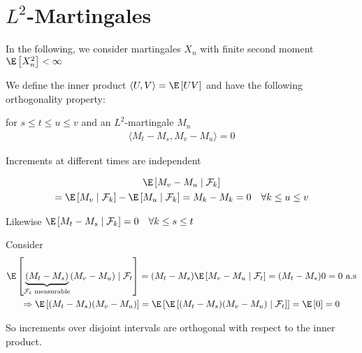 \section{$L^2$-Martingales}
In the following, we consider martingales $X_n$ with finite second moment $\E\left[X_n^2\right]<\infty$
\par\bigskip
\noindent We define the inner product $\langle U, V\rangle =\E\left[UV\right]$ and have the following orthogonality property:\par
\noindent for $s\leq t\leq u\leq v$ and an $L^2$-martingale $M_n$
\begin{equation*}
  \begin{gathered}
    \langle M_t-M_s, M_v-M_u\rangle = 0
  \end{gathered}
\end{equation*}\par
\noindent Increments at different times are independent
\par\bigskip
\begin{prf}[]{}
  \begin{equation*}
    \begin{gathered}
      \E\left[M_v-M_u\mid \mathcal{F}_k\right]\\
      =\E\left[M_v\mid\mathcal{F}_k\right]-\E\left[M_u\mid \mathcal{F}_k\right] = M_k-M_k = 0\quad\forall k\leq u\leq v
    \end{gathered}
  \end{equation*}\par
  \noindent Likewise $\E\left[M_t-M_s\mid\mathcal{F}_k\right]=0\quad\forall k\leq s\leq t$ 
  \par\bigskip
  \noindent Consider
  \begin{equation*}
    \begin{gathered}
      \E\left[\underbrace{\left(M_t-M_s\right)}_{\substack{\mathcal{F}_t\text{ measurable}}}(M_v-M_u)\mid\mathcal{F}_t\right] = (M_t-M_s)\E\left[M_v-M_u\mid\mathcal{F}_t\right] =(M_t-M_s)0 = 0\text{ a.s}\\
      \Rightarrow \E\left[(M_t-M_s)(M_v-M_u)\right] = \E\left[\E\left[(M_t-M_s)(M_v-M_u)\mid\mathcal{F}_t\right]\right] = \E\left[0\right] = 0
    \end{gathered}
  \end{equation*}
  \par\bigskip
  \noindent So increments over disjoint intervals are orthogonal with respect to the inner product.
\end{prf}
\par\bigskip
